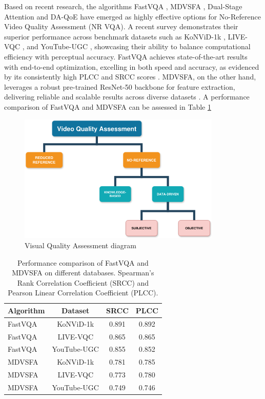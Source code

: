 Based on recent research, the algorithms FastVQA \cite{wu2022fastvqa}, MDVSFA \cite{li2023unified}, Dual-Stage Attention \cite{jia2024continuous} and DA-QoE \cite{li2022weakly} have emerged as highly effective options for No-Reference Video Quality Assessment (NR VQA). A recent survey \cite{min2024perceptual} demonstrates their superior performance across benchmark datasets such as KoNViD-1k \cite{hosu2017konvid}, LIVE-VQC \cite{sinno2018large}, and YouTube-UGC \cite{wang2019youtube}, showcasing their ability to balance computational efficiency with perceptual accuracy. FastVQA achieves state-of-the-art results with end-to-end optimization, excelling in both speed and accuracy, as evidenced by its consistently high PLCC and SRCC scores \cite{wu2022fastvqa}. MDVSFA, on the other hand, leverages a robust pre-trained ResNet-50 backbone for feature extraction, delivering reliable and scalable results across diverse datasets \cite{li2023unified}. A performance comparison of FastVQA and MDVSFA can be assessed in Table \ref{tab:fastvqa_mdvsfa_comparison}

\begin{figure}
    \includegraphics[width=0.86\textwidth]{figures/vqa_diagram.png}
    \caption{Visual Quality Assessment diagram}
    \label{fig:arch}
\end{figure}

\begin{table}[ht]
\centering
\caption{Performance comparison of FastVQA and MDVSFA on different databases. Spearman's Rank Correlation Coefficient (SRCC) and Pearson Linear Correlation Coefficient (PLCC).}
\label{tab:fastvqa_mdvsfa_comparison}
\begin{tabular}{lccc}
\hline
\textbf{Algorithm} & \textbf{Dataset} & \textbf{SRCC} & \textbf{PLCC} \\
\hline
FastVQA & KoNViD-1k    & 0.891 & 0.892 \\
FastVQA & LIVE-VQC     & 0.865 & 0.865 \\
FastVQA & YouTube-UGC  & 0.855 & 0.852 \\
\hline
MDVSFA  & KoNViD-1k    & 0.781 & 0.785 \\
MDVSFA  & LIVE-VQC     & 0.773 & 0.780 \\
MDVSFA  & YouTube-UGC  & 0.749 & 0.746 \\
\hline
\end{tabular}
\end{table}

